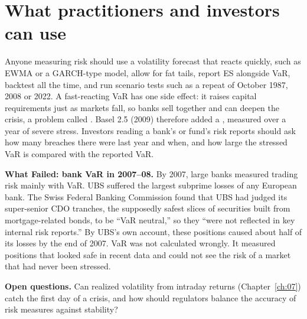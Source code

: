 \section{What practitioners and investors can use}
\label{sec:11-investors}

Anyone measuring risk should use a volatility forecast that reacts quickly, such as EWMA or a GARCH-type model, allow for fat tails, report ES alongside VaR, backtest all the time, and run scenario tests such as a repeat of October 1987, 2008 or 2022. A fast-reacting VaR has one side effect: it raises capital requirements just as markets fall, so banks sell together and can deepen the crisis, a problem called . Basel 2.5 (2009) therefore added a , measured over a year of severe stress. Investors reading a bank's or fund's risk reports should ask how many breaches there were last year and when, and how large the stressed VaR is compared with the reported VaR.

\textbf{What Failed: bank VaR in 2007--08.} By 2007, large banks measured trading risk mainly with VaR. UBS suffered the largest subprime losses of any European bank. The Swiss Federal Banking Commission found that UBS had judged its super-senior CDO tranches, the supposedly safest slices of securities built from mortgage-related bonds, to be ``VaR neutral,'' so they ``were not reflected in key internal risk reports.'' By UBS's own account, these positions caused about half of its losses by the end of 2007. VaR was not calculated wrongly. It measured positions that looked safe in recent data and could not see the risk of a market that had never been stressed.

\label{sec:11-open}
\textbf{Open questions.} Can realized volatility from intraday returns (Chapter~\ref{ch:07}) catch the first day of a crisis, and how should regulators balance the accuracy of risk measures against stability?

